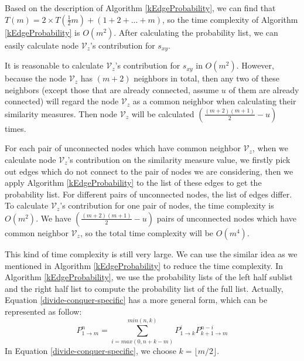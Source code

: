 \documentclass[\main/thesis.tex]{subfiles}
\begin{document}
Based on the description of Algorithm \ref{kEdgeProbability}, we can find that $T(m)=2\times T(\frac{1}{2}m)+(1+2+...+m)$, so the time complexity of Algorithm \ref{kEdgeProbability} is $O(m^2)$. After calculating the probability list, we can easily calculate node $\mathcal{V}_z$'s contribution for $s_{xy}$.%

It is reasonable to calculate $\mathcal{V}_z$'s contribution for $s_{xy}$ in $O(m^2)$. However, because the node $\mathcal{V}_z$ has $(m+2)$ neighbors in total, then any two of these neighbors (except those that are already connected, assume $u$ of them are already connected) will regard the node $\mathcal{V}_z$ as a common neighbor when calculating their similarity measures. Then node $\mathcal{V}_z$ will be calculated $(\frac{(m+2)(m+1)}{2}-u)$ times. 


For each pair of unconnected nodes which have common neighbor $\mathcal{V}_z$, when we calculate node $\mathcal{V}_z$'s contribution on the similarity measure value, we firstly pick out edges which do not connect to the pair of nodes we are considering, then we apply Algorithm \ref{kEdgeProbability} to the list of these edges to get the probability list. For different pairs of unconnected nodes, the list of edges differ. To calculate $\mathcal{V}_z$'s contribution for one pair of nodes, the time complexity is $O(m^2)$. We have $(\frac{(m+2)(m+1)}{2}-u)$ pairs of unconnected nodes which have common neighbor $\mathcal{V}_z$, so the total time complexity will be $O(m^4)$.

This kind of time complexity is still very large. We can use the similar idea as we mentioned in Algorithm \ref{kEdgeProbability} to reduce the time complexity. In Algorithm \ref{kEdgeProbability}, we use the probability lists of the left half sublist and the right half list to compute the probability list of the full list. Actually, Equation \ref{divide-conquer-specific} has a more general form, which can be represented as follow:
\begin{equation}
P_{1\rightarrow m}^n=\sum_{i=max(0,n+k-m)}^{min(n,k)}P_{1\rightarrow k}^i P_{k+1\rightarrow m}^{n-i}
\label{divide-conquer-general}
\end{equation}
In Equation \ref{divide-conquer-specific}, we choose $k=\lfloor m/2 \rfloor$.
\end{document}
